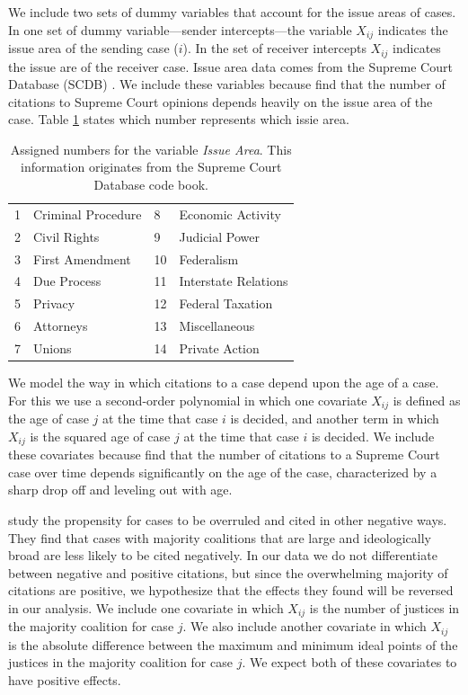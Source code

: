 \documentclass[headsepline=true, abstracton]{scrartcl}
\begin{document}
We include two sets of dummy variables that account for the issue areas of cases. In one set of dummy variable---sender intercepts---the variable $X_{ij}$ indicates the issue area of the sending case ($i$). In the set of receiver intercepts $X_{ij}$ indicates the issue are of the receiver case. Issue area data comes from the Supreme Court Database (SCDB) \citep{spaeth2014supreme}. We include these variables because \citet{cross2010determinants} find that the number of citations to Supreme Court opinions depends heavily on the issue area of the case. Table \ref{issue_area_coding} states which number represents which issie area.

\begin{table}[]
\centering
\begin{tabular}{llll}
1 & Criminal Procedure & 8  & Economic Activity    \\
2 & Civil Rights       & 9  & Judicial Power       \\
3 & First Amendment    & 10 & Federalism           \\
4 & Due Process        & 11 & Interstate Relations \\
5 & Privacy            & 12 & Federal Taxation     \\
6 & Attorneys          & 13 & Miscellaneous        \\
7 & Unions             & 14 & Private Action      
\end{tabular}
\caption{Assigned numbers for the variable \textit{Issue Area}. This information originates from the Supreme Court Database code book.}
\label{issue_area_coding}
\end{table}

We model the way in which citations to a case depend upon the age of a case. For this we use a second-order polynomial in which one covariate $X_{ij}$ is defined as the age of case $j$ at the time that case $i$ is decided, and another term in which $X_{ij}$ is the squared age of case $j$ at the time that case $i$ is decided. We include these covariates because \citet{black2013citation} find that the number of citations to a Supreme Court case over time depends significantly on the age of the case, characterized by a sharp drop off and leveling out with age. 

\citet{benjamin2012standing} study the propensity for cases to be overruled and cited in other negative ways. They find that cases with majority coalitions that are large and ideologically broad are less likely to be cited negatively. In our data we do not differentiate between negative and positive citations, but since the overwhelming majority of citations are positive, we hypothesize that the effects they found will be reversed in our analysis. We include one covariate in which $X_{ij}$ is the number of justices in the majority coalition for case $j$. We also include another covariate in which $X_{ij}$ is the absolute difference between the maximum and minimum ideal points of the justices in the majority coalition for case $j$. We expect both of these covariates to have positive effects.
\end{document}
